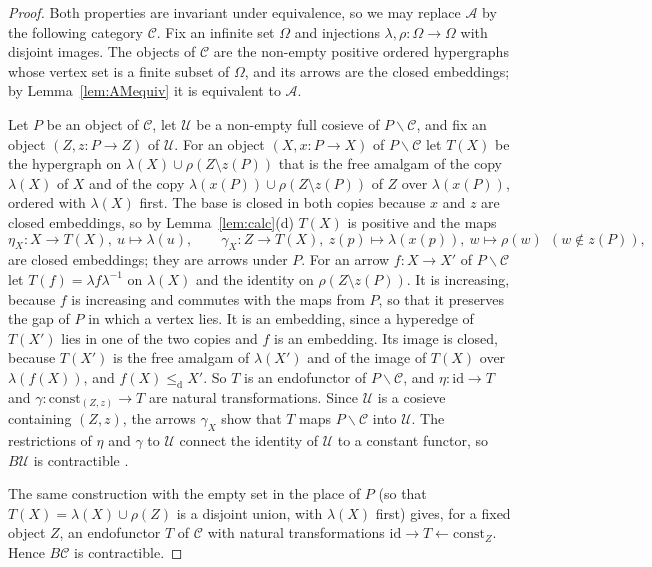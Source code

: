 \documentclass[11pt,a4paper]{article}
\theoremstyle{definition}
\newcommand{\cle}{\leq_{\mathrm{d}}}
\newcommand{\id}{\mathrm{id}}
\begin{document}
\begin{proof}
Both properties are invariant under equivalence, so we may replace $\mathcal A$
by the following category $\mathcal C$. Fix an infinite set $\Omega$ and
injections $\lambda,\rho\colon\Omega\to\Omega$ with disjoint images. The objects
of $\mathcal C$ are the non-empty positive ordered hypergraphs whose vertex set
is a finite subset of $\Omega$, and its arrows are the closed embeddings; by
Lemma~\ref{lem:AMequiv} it is equivalent to $\mathcal A$.

Let $P$ be an object of $\mathcal C$, let $\mathcal U$ be a non-empty full
cosieve of $P\backslash\mathcal C$, and fix an object $(Z,z\colon P\to Z)$ of
$\mathcal U$. For an object $(X,x\colon P\to X)$ of $P\backslash\mathcal C$ let
$T(X)$ be the hypergraph on $\lambda(X)\cup\rho(Z\setminus z(P))$ that is the free
amalgam of the copy $\lambda(X)$ of $X$ and of the copy
$\lambda(x(P))\cup\rho(Z\setminus z(P))$ of $Z$ over $\lambda(x(P))$, ordered
with $\lambda(X)$ first. The base is closed in both copies because $x$ and
$z$ are closed embeddings, so by Lemma~\ref{lem:calc}(d) $T(X)$ is positive and
the maps
\[
 \eta_X\colon X\to T(X),\ u\mapsto\lambda(u),\qquad
 \gamma_X\colon Z\to T(X),\ z(p)\mapsto\lambda(x(p)),\ w\mapsto\rho(w)\ \
 (w\notin z(P)),
\]
are closed embeddings; they are arrows under $P$. For an arrow
$f\colon X\to X'$ of $P\backslash\mathcal C$ let
$T(f)=\lambda f\lambda^{-1}$ on $\lambda(X)$ and the identity on
$\rho(Z\setminus z(P))$. It is increasing, because $f$ is increasing and
commutes with the maps from $P$, so that it preserves the gap of $P$ in which a
vertex lies. It is an embedding, since a hyperedge of $T(X')$ lies in one of
the two copies and $f$ is an embedding. Its image is closed, because $T(X')$
is the free amalgam of $\lambda(X')$ and of the image of $T(X)$ over
$\lambda(f(X))$, and $f(X)\cle X'$. So $T$ is an endofunctor of
$P\backslash\mathcal C$, and $\eta\colon\id\to T$ and
$\gamma\colon\mathrm{const}_{(Z,z)}\to T$ are natural transformations. Since
$\mathcal U$ is a cosieve containing $(Z,z)$, the arrows $\gamma_X$ show that
$T$ maps $P\backslash\mathcal C$ into $\mathcal U$. The restrictions of $\eta$
and $\gamma$ to $\mathcal U$ connect the identity of $\mathcal U$ to a constant
functor, so $B\mathcal U$ is contractible \cite[IV.3.2]{Kbook}.

The same construction with the empty set in the place of $P$ (so that
$T(X)=\lambda(X)\cup\rho(Z)$ is a disjoint union, with $\lambda(X)$ first)
gives, for a fixed object $Z$, an endofunctor $T$ of $\mathcal C$ with natural
transformations $\id\to T\leftarrow\mathrm{const}_Z$. Hence $B\mathcal C$ is
contractible.
\end{proof}
\end{document}
